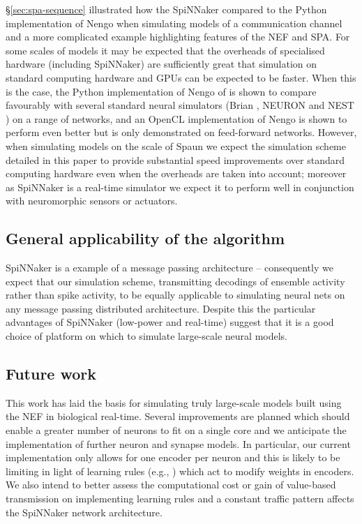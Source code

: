 \documentclass[conference]{IEEEtran}
\begin{document}
  \S\ref{sec:spa-sequence} illustrated how the SpiNNaker compared to the Python implementation of Nengo when simulating models of a communication channel and a more complicated example highlighting features of the NEF and SPA.
  For some scales of models it may be expected that the overheads of specialised hardware (including SpiNNaker) are sufficiently great that simulation on standard computing hardware and GPUs can be expected to be faster.
  When this is the case, the Python implementation of Nengo of \textcite[\S6]{Bekolay2014} is shown to compare favourably with several standard neural simulators (Brian \parencite{Goodman2009}, NEURON \parencite{Hines2009} and NEST \parencite{Eppler2009}) on a range of networks, and an OpenCL implementation of Nengo is shown to perform even better but is only demonstrated on feed-forward networks.
  However, when simulating models on the scale of Spaun we expect the simulation scheme detailed in this paper to provide substantial speed improvements over standard computing hardware even when the overheads are taken into account; moreover as SpiNNaker is a real-time simulator we expect it to perform well in conjunction with neuromorphic sensors or actuators.

  \subsection{General applicability of the algorithm}

  SpiNNaker is a example of a message passing architecture -- consequently we expect that our simulation scheme, transmitting decodings of ensemble activity rather than spike activity, to be equally applicable to simulating neural nets on any message passing distributed architecture.
  Despite this the particular advantages of SpiNNaker (low-power and real-time) suggest that it is a good choice of platform on which to simulate large-scale neural models.

  \subsection{Future work}

  This work has laid the basis for simulating truly large-scale models built using the NEF in biological real-time.
  Several improvements are planned which should enable a greater number of neurons to fit on a single core and we anticipate the implementation of further neuron and synapse models.
  In particular, our current implementation only allows for one encoder per neuron and this is likely to be limiting in light of learning rules (e.g., \parencite{Voelker2014}) which act to modify weights in encoders.
  We also intend to better assess the computational cost or gain of value-based transmission on implementing learning rules and a constant traffic pattern affects the SpiNNaker network architecture.
\end{document}
